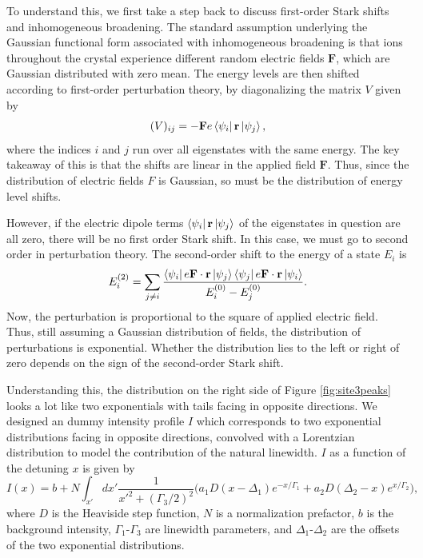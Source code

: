 \documentclass[12pt]{report}
\begin{document}
To understand this, we first take a step back to discuss first-order Stark shifts and inhomogeneous broadening. The standard assumption underlying the Gaussian functional form associated with inhomogeneous broadening is that ions throughout the crystal experience different random electric fields $\mathbf{F}$, which are Gaussian distributed with zero mean. The energy levels are then shifted according to first-order perturbation theory, by diagonalizing the matrix $V$ given by
\begin{equation}\label{eq:2}
  (V)_{ij} = -\mathbf{F}e\bra{\psi_{i}}\mathbf{r}\ket{\psi_{j}},
\end{equation}
where the indices $i$ and $j$ run over all eigenstates with the same energy. The key takeaway of this is that the shifts are linear in the applied field $\mathbf{F}$. Thus, since the distribution of electric fields $F$ is Gaussian, so must be the distribution of energy level shifts.

However, if the electric dipole terms $\bra{\psi_{i}}\mathbf{r}\ket{\psi_{j}}$ of the eigenstates in question are all zero, there will be no first order Stark shift. In this case, we must go to second order in perturbation theory. The second-order shift to the energy of a state $E_{i}$ is 
\begin{equation}\label{eq:8}
E_{i}^{(2)} = \sum_{j\neq i }\frac{\bra{\psi_{i}}e\mathbf{F}\cdot\mathbf{r}\ket{\psi_{j}}\bra{\psi_{j}}e\mathbf{F}\cdot\mathbf{r}\ket{\psi_{i}}}{E_{i}^{(0)}-E_{j}^{(0)}}.
\end{equation}
Now, the perturbation is proportional to the square of applied electric field. Thus, still assuming a Gaussian distribution of fields, the distribution of perturbations is exponential. Whether the distribution lies to the left or right of zero depends on the sign of the second-order Stark shift.

Understanding this, the distribution on the right side of Figure \ref{fig:site3peaks} looks a lot like two exponentials with tails facing in opposite directions. We designed an dummy intensity profile $I$ which corresponds to two exponential distributions facing in opposite directions, convolved with a Lorentzian distribution to model the contribution of the natural linewidth. $I$ as a function of the detuning $x$ is given by \begin{equation}\label{eq:1}
  I(x) = b+N\int_{x'}dx'\frac{1}{x'^{2}+(\Gamma_{3}/2)^{2}}\Big(
    a_{1} D(x - \Delta_{1}) e^{-x/\Gamma_{1}} + a_{2}D(\Delta_{2}-x)e^{x/\Gamma_{2}}
  \Big) ,
\end{equation}
where $D$ is the Heaviside step function, $N$ is a normalization prefactor, $b$ is the background intensity, $\Gamma_{1}$-$\Gamma_{3}$ are linewidth parameters, and $\Delta_{1}$-$\Delta_{2}$ are the offsets of the two exponential distributions.
\end{document}
